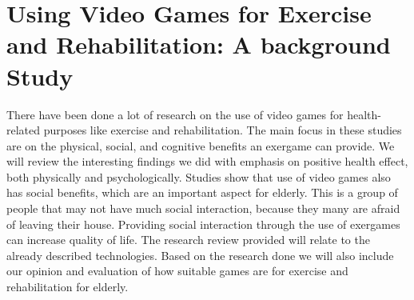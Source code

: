 \section{Using Video Games for Exercise and Rehabilitation: A background Study}
There have been done a lot of research on the use of video games for health-related purposes like exercise and rehabilitation. The main focus in these studies are on the physical, social, and cognitive benefits an exergame can provide. We will review the interesting findings we did with emphasis on positive health effect, both physically and psychologically. Studies show that use of video games also has social benefits, which are an important aspect for elderly. This is a group of people that may not have much social interaction, because they many are afraid of leaving their house. Providing social interaction through the use of exergames can increase quality of life. The research review provided will relate to the already described technologies. Based on the research done we will also include our opinion and evaluation of how suitable games are for exercise and rehabilitation for elderly. \\ \\
